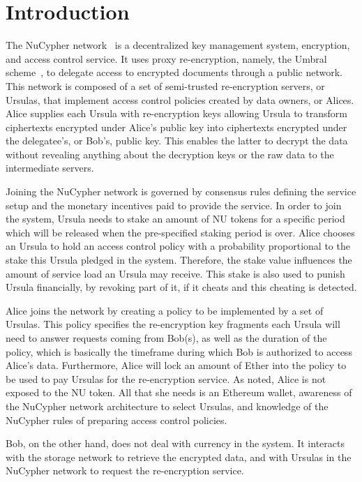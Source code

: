 \section{Introduction}
\label{intro}
The NuCypher network~\cite{egorov2017nucypher} is a decentralized key management 
system, encryption, and access control service. It uses proxy re-encryption, namely, the 
Umbral scheme~\cite{umbral2018}, to delegate access to encrypted 
documents through a public network. This network is composed of a set of semi-trusted 
re-encryption servers, or Ursulas, that implement access control policies created by data 
owners, or Alices. Alice supplies each Ursula with re-encryption keys allowing Ursula to transform 
ciphertexts encrypted under Alice's public key into ciphertexts encrypted under the delegatee's, or Bob's,
public key. This enables the latter to decrypt the data without revealing anything about the
decryption keys or the raw data to the intermediate servers.


Joining the NuCypher network is governed by consensus rules defining the service setup
and the monetary incentives paid to provide the service. In order to join the 
system, Ursula needs to stake an amount of NU tokens for a specific period
which will be released when the pre-specified staking period is over. Alice chooses an
Ursula to hold an access control policy with a probability proportional to the stake this Ursula 
pledged in the system. Therefore, the stake value influences the amount of service load an Ursula
may receive. This stake is also used to punish Ursula financially, by revoking part 
of it, if it cheats and this cheating is detected. 


Alice joins the network by creating a policy to be implemented by a 
set of Ursulas. This policy specifies the re-encryption key fragments each Ursula will
need to answer requests coming from Bob(s), as well as the duration of the policy, which 
is basically the timeframe during which Bob is authorized to access Alice's data.  Furthermore,
Alice will lock an amount of Ether into the policy to be used to pay Ursulas for the re-encryption 
service. As noted, Alice is not exposed to the NU token. All that she needs is an Ethereum
wallet, awareness of the NuCypher network architecture to select Ursulas, and knowledge of the
NuCypher rules of preparing access control policies.


Bob, on the other hand, does not deal with currency in the system. It interacts with the storage 
network to retrieve the encrypted data, and with Ursulas in the NuCypher network to request the
re-encryption service.


